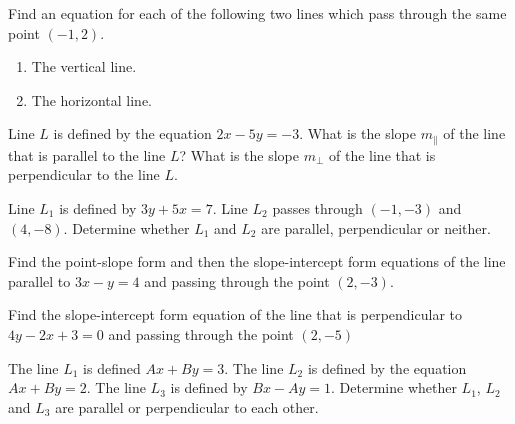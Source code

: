 \begin{exercise}

Find an equation for each of the following two lines which pass through
the same point \((-1, 2)\).

\begin{enumerate}
\item
  The vertical line.
\item
  The horizontal line.
\end{enumerate}

\end{exercise}
\vspace*{2\baselineskip}

\begin{exercise}

Line \(L\) is defined by the equation \(2x-5y=-3\). What is the slope
\(m_\parallel\) of the line that is parallel to the line \(L\)? What is
the slope \(m_\perp\) of the line that is perpendicular to the line
\(L\).

\end{exercise}
\vspace*{6\baselineskip}

\begin{exercise}

Line \(L_1\) is defined by \(3y+5x=7\). Line \(L_2\) passes through
\((-1, -3)\) and \((4, -8)\). Determine whether \(L_1\) and \(L_2\) are
parallel, perpendicular or neither.

\end{exercise}
\vspace*{6\baselineskip}

\begin{exercise}

Find the point-slope form and then the slope-intercept form equations of
the line parallel to \(3x-y=4\) and passing through the point
\((2,-3)\).

\end{exercise}
\vspace*{6\baselineskip}

\begin{exercise}

Find the slope-intercept form equation of the line that is perpendicular
to \(4y-2x+3=0\) and passing through the point \((2, -5)\)

\end{exercise}
\vspace*{6\baselineskip}

\begin{exercise}

The line \(L_1\) is defined \(Ax+By=3\). The line \(L_2\) is defined by
the equation \(Ax+By=2\). The line \(L_3\) is defined by \(Bx-Ay=1\).
Determine whether \(L_1\), \(L_2\) and \(L_3\) are parallel or
perpendicular to each other.

\end{exercise}
\vspace*{6\baselineskip}

